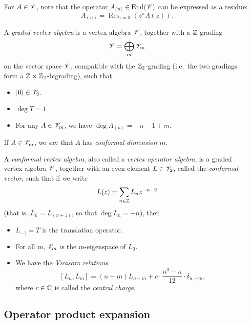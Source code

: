 For $A \in \mathscr{V}$, note that the operator $A_{(n)} \in \operatorname{End} (\mathscr{V})$
can be expressed as a residue:
\[
    A_{(n)} = \operatorname{Res}_{z = 0} (z^n A(z)).
\]

\begin{definition}
    A \emph{graded vertex algebra}
    is a vertex algebra $\mathscr{V}$,
    together with a $\mathbb{Z}$-grading
    \[
        \mathscr{V} = \bigoplus_{m} \mathscr{V}_m
    \]
    on the vector space $\mathscr{V}$, compatible with the $\mathbb{Z}_2$-grading
    (i.e.\ the two gradings form a $\mathbb{Z} \times \mathbb{Z}_2$-bigrading),
    such that
    \begin{itemize}
        \item
            $\mathinner{\mathopen{|}0\mathclose{\rangle}} \in \mathscr{V}_0$.
        \item
            $\deg T = 1$.
        \item
            For any $A \in \mathscr{V}_m$,
            we have $\deg A_{(n)} = -n - 1 + m$.
    \end{itemize}
    If $A \in \mathscr{V}_m$,
    we say that $A$ has \emph{conformal dimension} $m$.
    \varqed
\end{definition}

\begin{definition}
    A \emph{conformal vertex algebra},
    also called a \emph{vertex operator algebra},
    is a graded vertex algebra $\mathscr{V}$,
    together with an even element $L \in \mathscr{V}_2$,
    called the \emph{conformal vector},
    such that if we write
    \[
        L (z) = \sum _{n \in \mathbb{Z}} L_{n} z^{-n-2}
    \]
    (that is, $L_n = L_{(n+1)}$, so that $\deg L_n = -n$), then
    \begin{itemize}
        \item
            $L_{-1} = T$ is the translation operator.
        \item
            For all $m$, $\mathscr{V}_m$ is the $m$-eigenspace of $L_0$.
        \item
            We have the \emph{Virasoro relations}
            \[
                [L_n, L_m] =
                (n - m) L_{n + m} +
                c \cdot \frac{n^3 - n}{12} \cdot \delta_{n, -m},
            \]
            where $c \in \mathbb{C}$ is called the \emph{central charge}.
            \varqed
    \end{itemize}
\end{definition}


\subsection{Operator product expansion}

